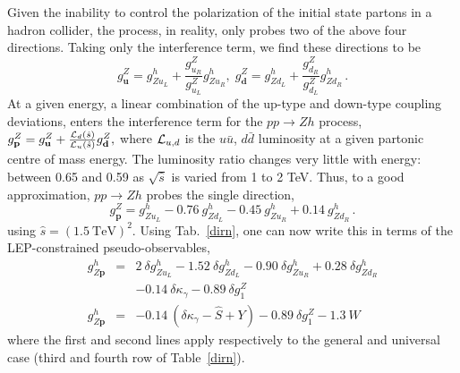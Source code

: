 \documentclass[../report.tex]{subfiles}
\begin{document}
Given the inability to control the polarization of the initial state partons in a hadron collider, 
the process, in reality, only probes two of the above four directions. Taking only the interference 
term, we find these directions to be
\begin{equation}
g^Z_{\textbf{u}}= g^h_{Zu_L}+\frac{g^Z_{u_R}}{g^Z_{u_L}} g^h_{Zu_R},\; 
g^Z_{\textbf{d}}= g^h_{Zd_L}+\frac{g^Z_{d_R}}{g^Z_{d_L}} g^h_{Zd_R}\,.
\end{equation}
 At a given energy, a linear combination of the up-type and down-type coupling 
 deviations, enters the interference term for the 
 $pp \to Zh$ process, $g^Z_{\textbf{p}}= g^Z_{\textbf{u}}+ \frac{{\cal L}_d(\hat{s})}{{\cal L}_u(\hat{s})}g^Z_{\textbf{d}},$
where ${\cal L}_{u,d}$ is the $u \bar{u}$, $d \bar{d}$ luminosity at a given partonic centre of mass 
energy. The luminosity ratio changes very little with energy: between 0.65 and 0.59 as 
$\sqrt{\hat{s}}$ is varied from 1 to  2 TeV. Thus, to a good approximation, $pp \to Zh$ probes 
the single direction, 
\begin{equation}
g^Z_{\textbf{p}}=g^h_{Zu_L} -0.76~g^h_{Zd_L}   - 0.45~g^h_{Zu_R} + 0.14~g^h_{Zd_R}  \,.
\label{compdir}
\end{equation}
using ${\hat{s}}=(1.5~\text{TeV})^2$. Using Tab.~\ref{dirn}, one can now write this in terms of the LEP-constrained pseudo-observables,
\begin{eqnarray}
g^h_{Z\textbf{p}}&=&2~\delta g^h_{Zu_L} -1.52~\delta g^h_{Zd_L}   - 0.90~\delta g^h_{Zu_R} + 0.28~\delta g^h_{Zd_R}\nonumber\\
&&-0.14~\delta \kappa_\gamma   -0.89~\delta g^Z_1 \nonumber\\
g^h_{Z\textbf{p}}&=&-0.14~(\delta \kappa_\gamma-\hat{S}+Y) -0.89~\delta g^Z_1  -1.3~W
\label{diru}
\end{eqnarray}
where the first  and second lines apply respectively to the general and universal case (third and fourth row of Table~\ref{dirn}). 
 
\end{document}
